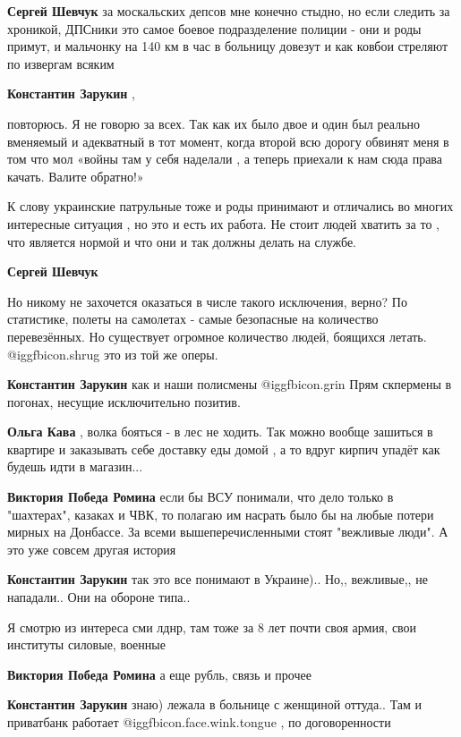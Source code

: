 \begin{itemize}
\begin{itemize}
\textbf{Сергей Шевчук} за москальских депсов мне конечно стыдно, но если следить за хроникой, ДПСники это самое боевое подразделение полиции - они и роды примут, и мальчонку на 140 км в час в больницу довезут и как ковбои стреляют по извергам всяким

\textbf{Константин Зарукин} , 

повторюсь. Я не говорю за всех. Так как их было двое и один был реально
вменяемый и адекватный в тот момент, когда второй всю дорогу обвинят меня в том
что мол «войны там у себя наделали , а теперь приехали к нам сюда права качать.
Валите обратно!»

К слову украинские патрульные тоже и роды принимают и отличались во многих
интересные ситуация , но это и есть их работа. Не стоит людей хватить за то ,
что является нормой и что они и так должны делать на службе.

\textbf{Сергей Шевчук} 

Но никому не захочется оказаться в числе такого исключения, верно? По
статистике, полеты на самолетах - самые безопасные на количество перевезённых.
Но существует огромное количество людей, боящихся летать.  @igg{fbicon.shrug}
это из той же оперы.

\textbf{Константин Зарукин} как и наши полисмены  @igg{fbicon.grin}  Прям скпермены в погонах, несущие исключительно позитив.

\textbf{Ольга Кава} , волка бояться - в лес не ходить.
Так можно вообще зашиться в квартире и заказывать себе доставку еды домой , а то вдруг кирпич упадёт как будешь идти в магазин...

\textbf{Виктория Победа Ромина} если бы ВСУ понимали, что дело только в "шахтерах", казаках и ЧВК, то полагаю им насрать было бы на любые потери мирных на Донбассе. За всеми вышеперечисленными стоят "вежливые люди". А это уже совсем другая история

\textbf{Константин Зарукин} так это все понимают в Украине).. Но,, вежливые,, не нападали.. Они на обороне типа..

Я смотрю из интереса сми лднр, там тоже за 8 лет почти своя армия, свои институты силовые, военные

\textbf{Виктория Победа Ромина} а еще рубль, связь и прочее

\textbf{Константин Зарукин} знаю) лежала в больнице с женщиной оттуда.. Там и приватбанк работает @igg{fbicon.face.wink.tongue} , по договоренности


\end{itemize}
\end{itemize}
